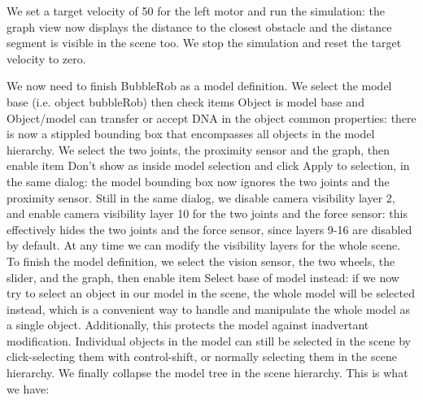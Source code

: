 
We set a target velocity of 50 for the left motor and run the simulation: 
the graph view now displays the distance to the closest obstacle and the 
distance segment is visible in the scene too. We stop the simulation and
reset the target velocity to zero.

We now need to finish BubbleRob as a model definition. We select the model 
base (i.e. object bubbleRob) then check items Object is model base and 
Object/model can transfer or accept DNA in the object common properties: 
there is now a stippled bounding box that encompasses all objects in the
model hierarchy. We select the two joints, the proximity sensor and the 
graph, then enable item Don't show as inside model selection and click 
Apply to selection, in the same dialog: the model bounding box now ignores
the two joints and the proximity sensor. Still in the same dialog, we 
disable camera visibility layer 2, and enable camera visibility layer 10
for the two joints and the force sensor: this effectively hides the two 
joints and the force sensor, since layers 9-16 are disabled by default. At
any time we can modify the visibility layers for the whole scene. To finish
the model definition, we select the vision sensor, the two wheels, the
slider, and the graph, then enable item Select base of model instead: if we
now try to select an object in our model in the scene, the whole model will
be selected instead, which is a convenient way to handle and manipulate the
whole model as a single object. Additionally, this protects the model 
against inadvertant modification. Individual objects in the model can still
be selected in the scene by click-selecting them with control-shift, or
normally selecting them in the scene hierarchy. We finally collapse the
model tree in the scene hierarchy. This is what we have:


